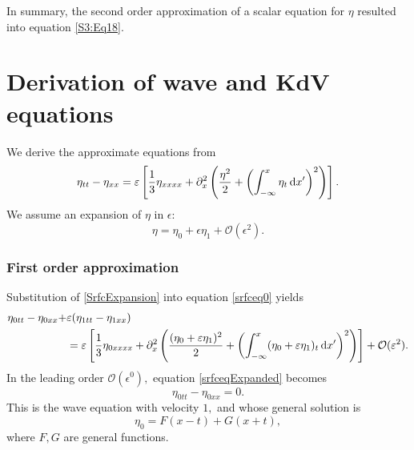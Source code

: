 In summary, the second order approximation of a scalar equation for $\eta$ resulted into equation \eqref{S3:Eq18}.
\label{Rmk2}

\section{Derivation of wave and KdV equations}
We derive the approximate equations from
\begin{equation}\label{srfceq0}
\eta_{tt} - \eta_{xx} = \varepsilon \left[ \frac{1}{3}\eta_{xxxx} +  \partial_x^2 \left( \frac{\eta^2}{2} + \left( \int^{x}_{-\infty} \eta_t \,\mathrm{d} x' \right)^2\right)\right].
\end{equation}
We assume an expansion of $\eta$ in $\epsilon:$
\begin{equation}\label{SrfcExpansion}
\eta = \eta_0 + \epsilon \eta_1 + \mathcal{O}(\epsilon^2).
\end{equation}
\subsubsection*{First order approximation}
Substitution of \eqref{SrfcExpansion} into equation \eqref{srfceq0} yields
\begin{equation}\label{srfceqExpanded}
\begin{aligned}
\eta_{0tt} - \eta_{0xx} +&\varepsilon(\eta_{1tt} - \eta_{1xx}) \\
&= \varepsilon \left[ \frac{1}{3}\eta_{0xxxx} +  \partial_x^2 \left( \frac{(\eta_0 + \varepsilon \eta_1)^2}{2} + \left( \int^{x}_{-\infty} (\eta_0 + \varepsilon \eta_1)_t \,\mathrm{d} x' \right)^2\right)\right] + \mathcal{O}(\varepsilon^2). 
\end{aligned}
\end{equation}
In the leading order $\mathcal{O}(\epsilon^0),$ equation \eqref{srfceqExpanded} becomes
\begin{equation*}
\eta_{0tt} - \eta_{0xx} = 0.
\end{equation*}
This is the wave equation with velocity $1,$ and whose general solution is 
\[ \eta_0 = F(x-t) + G(x+t), \]
where $F,G$ are general functions. 
